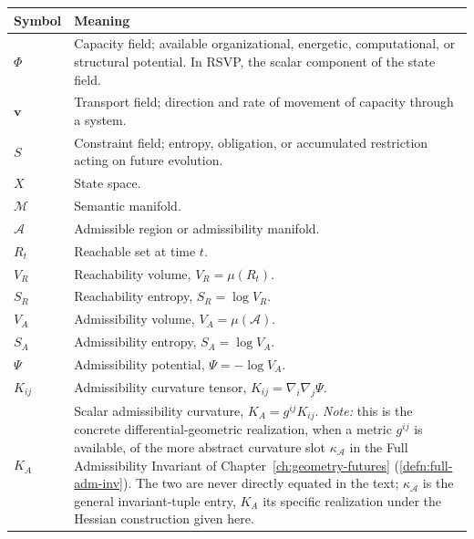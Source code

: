 \documentclass[12pt,twoside,openright]{book}
\newcommand{\adm}{\mathcal{A}}
\begin{document}
\begin{center}
\small
\begin{longtable}{p{3cm}p{10cm}}
\toprule
Symbol & Meaning \\
\midrule
\endhead

$\Phi$
&
Capacity field; available organizational, energetic,
computational, or structural potential. In RSVP,
the scalar component of the state field.
\\

$\mathbf v$
&
Transport field; direction and rate of movement of
capacity through a system.
\\

$S$
&
Constraint field; entropy, obligation, or accumulated
restriction acting on future evolution.
\\

$X$
&
State space.
\\

$\mathcal M$
&
Semantic manifold.
\\

$\mathcal A$
&
Admissible region or admissibility manifold.
\\

$R_t$
&
Reachable set at time $t$.
\\

$V_R$
&
Reachability volume,
$V_R=\mu(R_t)$.
\\

$S_R$
&
Reachability entropy,
$S_R=\log V_R$.
\\

$V_A$
&
Admissibility volume,
$V_A=\mu(\mathcal A)$.
\\

$S_A$
&
Admissibility entropy,
$S_A=\log V_A$.
\\

$\Psi$
&
Admissibility potential,
$\Psi=-\log V_A$.
\\

$K_{ij}$
&
Admissibility curvature tensor,
$K_{ij}=\nabla_i\nabla_j\Psi$.
\\

$K_A$
&
Scalar admissibility curvature, $K_A = g^{ij}K_{ij}$.
\emph{Note:} this is the concrete differential-geometric
realization, when a metric $g^{ij}$ is available, of the more
abstract curvature slot $\kappa_\adm$ in the Full Admissibility
Invariant of Chapter~\ref{ch:geometry-futures}
(\cref{defn:full-adm-inv}). The two are never directly equated
in the text; $\kappa_\adm$ is the general invariant-tuple entry,
$K_A$ its specific realization under the Hessian construction
given here.
\\


\end{longtable}
\end{center}
\end{document}
